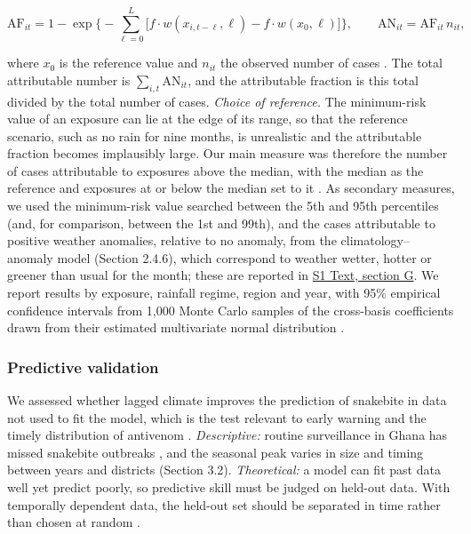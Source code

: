\documentclass[11pt,a4paper]{article}
\begin{document}
\[\mathrm{AF}_{it} = 1 - \exp\Big\lbrace -\sum_{\ell=0}^{L} \big[f\cdot w(x_{i,t-\ell},\ell) - f\cdot w(x_0,\ell)\big]\Big\rbrace, \qquad \mathrm{AN}_{it} = \mathrm{AF}_{it}\, n_{it},\]

where \(x_0\) is the reference value and \(n_{it}\) the observed number of cases \cite{ref46}. The total attributable number is \(\sum_{i,t} \mathrm{AN}_{it}\), and the attributable fraction is this total divided by the total number of cases. \emph{Choice of reference.} The minimum-risk value of an exposure can lie at the edge of its range, so that the reference scenario, such as no rain for nine months, is unrealistic and the attributable fraction becomes implausibly large. Our main measure was therefore the number of cases attributable to exposures above the median, with the median as the reference and exposures at or below the median set to it \cite{ref46}. As secondary measures, we used the minimum-risk value searched between the 5th and 95th percentiles (and, for comparison, between the 1st and 99th), and the cases attributable to positive weather anomalies, relative to no anomaly, from the climatology--anomaly model (Section 2.4.6), which correspond to weather wetter, hotter or greener than usual for the month; these are reported in \hyperref[s1text-g]{S1 Text, section G}. We report results by exposure, rainfall regime, region and year, with 95\% empirical confidence intervals from 1,000 Monte Carlo samples of the cross-basis coefficients drawn from their estimated multivariate normal distribution \cite{ref46}.

\subsubsection{Predictive validation}

We assessed whether lagged climate improves the prediction of snakebite in data not used to fit the model, which is the test relevant to early warning and the timely distribution of antivenom \cite{ref3}. \emph{Descriptive:} routine surveillance in Ghana has missed snakebite outbreaks \cite{ref4}, and the seasonal peak varies in size and timing between years and districts (Section 3.2). \emph{Theoretical:} a model can fit past data well yet predict poorly, so predictive skill must be judged on held-out data. With temporally dependent data, the held-out set should be separated in time rather than chosen at random \cite{ref37}.
\end{document}

